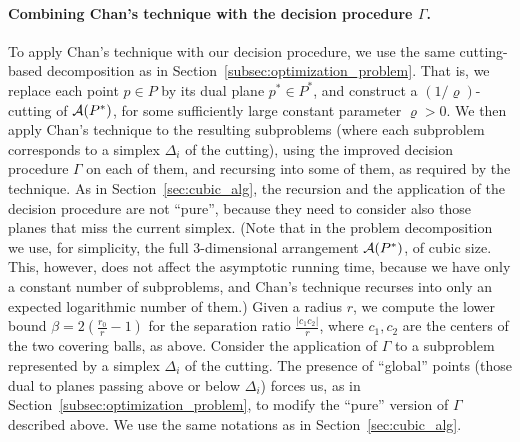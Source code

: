 \documentclass[a4paper,12pt]{article}
\def\A{{\cal A}}
\begin{document}
\paragraph{Combining Chan's technique with the decision procedure $\Gamma$.}
To apply Chan's technique with our decision procedure, we use the
same cutting-based decomposition as in
Section~\ref{subsec:optimization_problem}. That is, we replace each
point $p \in P$ by its dual plane $p^* \in P^*$, and construct a
$(1/\varrho)$-cutting of $\A(P^*)$, for some sufficiently large
constant parameter $\varrho>0$. We then apply Chan's technique to
the resulting subproblems (where each subproblem corresponds to a
simplex $\Delta_i$ of the cutting), using the improved decision
procedure $\Gamma$ on each of them, and recursing into some of them,
as required by the technique. As in Section~\ref{sec:cubic_alg}, the
recursion and the application of the decision procedure are not
``pure'', because they need to consider also those planes that miss
the current simplex. (Note that in the problem decomposition we use,
for simplicity, the full 3-dimensional arrangement $\A(P^*)$, of
cubic size. This, however, does not affect the asymptotic running
time, because we have only a constant number of subproblems, and
Chan's technique recurses into only an expected logarithmic number
of them.) Given a radius $r$, we compute the lower bound $\beta =
2\left(\frac{r_0}{r} -1\right)$ for the separation ratio
$\frac{|c_1c_2|}{r}$, where $c_1, c_2$ are the centers of the two
covering balls, as above. Consider the application of $\Gamma$ to a
subproblem represented by a simplex $\Delta_i$ of the cutting. The
presence of ``global'' points (those dual to planes passing above or
below $\Delta_i$) forces us, as in
Section~\ref{subsec:optimization_problem}, to modify the ``pure''
version of $\Gamma$ described above. We use the same notations as in
Section~\ref{sec:cubic_alg}.
\end{document}
